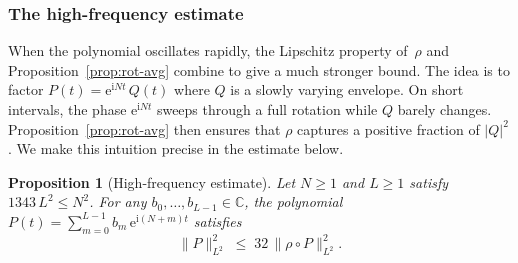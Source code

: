 \documentclass[11pt]{amsart}
\newtheorem{proposition}[theorem]{Proposition}
\theoremstyle{remark}
\begin{document}
\subsubsection{The high-frequency estimate}\label{sec:high-freq}

When the polynomial oscillates rapidly, the Lipschitz property
of~$\rho$ and 
Proposition~\ref{prop:rot-avg} combine to give a much stronger bound.  The idea
is to factor $P(t) = \mathrm{e}^{\mathrm{i} Nt}\, Q(t)$ where $Q$ is a slowly varying
envelope. On short intervals, the phase $\mathrm{e}^{\mathrm{i} Nt}$ sweeps through
a full rotation while $Q$ barely changes. Proposition~\ref{prop:rot-avg} then
ensures that $\rho$ captures a positive fraction of $\lvert Q \rvert^2$.  We make this intuition precise in the estimate below.

\begin{proposition}[High-frequency estimate]\label{prop:high-freq} Let $N \ge 1$ and $L \ge 1$ satisfy $1343\, L^2 \le N^2$.
For any $b_0, \dots, b_{L-1} \in \mathbb{C}$, the polynomial
$P(t) = \sum_{m=0}^{L-1} b_m\, \mathrm{e}^{\mathrm{i}(N+m)t}$ satisfies
\[
\lVert P \rVert_{L^2}^2
\;\le\;
32\, \lVert \rho \circ P \rVert_{L^2}^2.
\]
\end{proposition}
\end{document}
